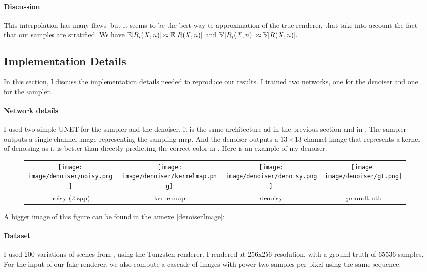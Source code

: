 \documentclass{classeENS}
\begin{document}
\paragraph*{Discussion} This interpolation has many flaws, but it seems to be 
 the best way to approximation of the true renderer, that take into 
 account the fact that our samples are stratified. We have 
 $\mathbb E[R_i(X,n)] \approx \mathbb E[R(X,n)]$ and $\mathbb V[R_i(X,n)] \approx \mathbb V[R(X,n)]$.

\subsection{Implementation Details}

In this section, I discuss the implementation details needed to reproduce 
our results. I trained two networks, one for the denoiser and one 
for the sampler.

\paragraph*{Network details} I used two simple UNET for the sampler and the denoiser, 
it is the same architecture ad in the previous section and in \cite{kuznetsov2018deep}. 
The sampler outputs a single channel image representing the sampling map. And the denoiser
outputs a $13\times13$ channel image that represents a kernel of denoising as it 
is better than directly predicting the correct color in \cite{10.1145/3072959.3073708}. 
Here is an example of my denoiser:

\begin{figure}[H]
    \centering
    \begin{tabular}{cccc}
    \texttt{[image: image/denoiser/noisy.png]}
    & \texttt{[image: image/denoiser/kernelmap.png]}
    & \texttt{[image: image/denoiser/denoisy.png]}
    & \texttt{[image: image/denoiser/gt.png]} \\
    noisy (2 spp) & kernelmap & denoisy & groundtruth \\
    \end{tabular}
\end{figure}
A bigger image of this figure can be found in the annexe \ref{denoiserImage}:

\paragraph*{Dataset} I used 200 variations of scenes from \cite{resources16}, using 
the Tungsten renderer. I rendered at 256x256 resolution, with a ground 
truth of 65536 samples. For the input of our fake renderer, we also 
compute a cascade of images with power two samples per pixel using the 
same sequence.
\end{document}
